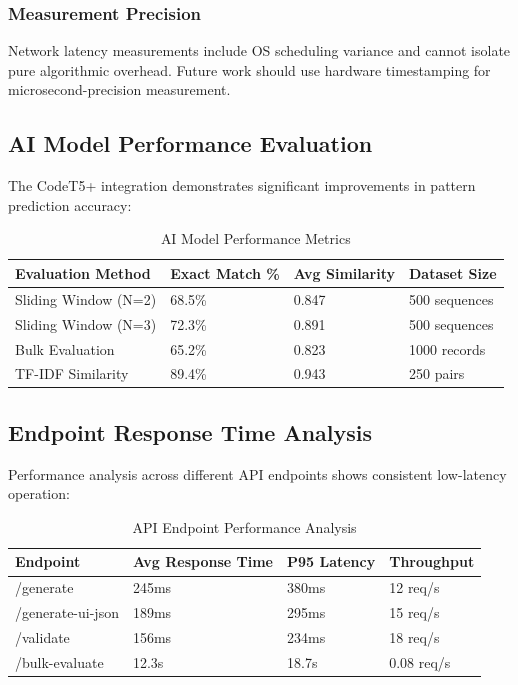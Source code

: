 \documentclass[12pt,a4paper]{article}
\begin{document}
\subsubsection{Measurement Precision}

Network latency measurements include OS scheduling variance and cannot isolate pure algorithmic overhead. Future work should use hardware timestamping for microsecond-precision measurement.

\subsection{AI Model Performance Evaluation}

The CodeT5+ integration demonstrates significant improvements in pattern prediction accuracy:

\begin{table}[H]
\centering
\begin{tabular}{|l|l|l|l|}
\hline
\textbf{Evaluation Method} & \textbf{Exact Match \%} & \textbf{Avg Similarity} & \textbf{Dataset Size} \\
\hline
Sliding Window (N=2) & 68.5\% & 0.847 & 500 sequences \\
Sliding Window (N=3) & 72.3\% & 0.891 & 500 sequences \\
Bulk Evaluation & 65.2\% & 0.823 & 1000 records \\
TF-IDF Similarity & 89.4\% & 0.943 & 250 pairs \\
\hline
\end{tabular}
\caption{AI Model Performance Metrics}
\label{tab:ai-performance}
\end{table}

\subsection{Endpoint Response Time Analysis}

Performance analysis across different API endpoints shows consistent low-latency operation:

\begin{table}[H]
\centering
\begin{tabular}{|l|l|l|l|}
\hline
\textbf{Endpoint} & \textbf{Avg Response Time} & \textbf{P95 Latency} & \textbf{Throughput} \\
\hline
/generate & 245ms & 380ms & 12 req/s \\
/generate-ui-json & 189ms & 295ms & 15 req/s \\
/validate & 156ms & 234ms & 18 req/s \\
/bulk-evaluate & 12.3s & 18.7s & 0.08 req/s \\
\hline
\end{tabular}
\caption{API Endpoint Performance Analysis}
\label{tab:api-performance}
\end{table}
\end{document}
